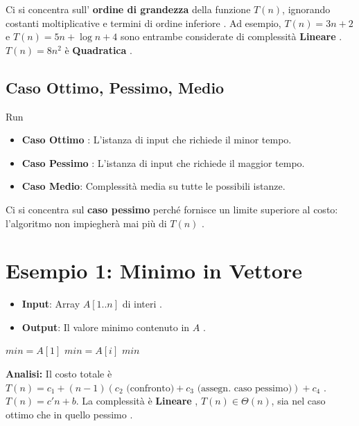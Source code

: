 Ci si concentra sull' \textbf{ordine di grandezza} della funzione $T(n)$, ignorando costanti moltiplicative e termini di ordine inferiore .
Ad esempio, $T(n) = 3n + 2$ e $T(n) = 5n + \log n + 4$ sono entrambe considerate di complessità \textbf{Lineare} . $T(n) = 8n^2$ è \textbf{Quadratica} .

\subsection{Caso Ottimo, Pessimo, Medio}

Run

  
\begin{itemize}
    \item \textbf{Caso Ottimo} : L'istanza di input che richiede il minor tempo.
    \item \textbf{Caso Pessimo} : L'istanza di input che richiede il maggior tempo.
    \item \textbf{Caso Medio}: Complessità media su tutte le possibili istanze.
\end{itemize}
Ci si concentra sul \textbf{caso pessimo} perché fornisce un limite superiore al costo: l'algoritmo non impiegherà mai più di $T(n)$ .

\section{Esempio 1: Minimo in Vettore}
\begin{itemize}
    \item \textbf{Input}: Array $A[1..n]$ di interi .
    \item \textbf{Output}: Il valore minimo contenuto in $A$ .
\end{itemize}

\begin{algorithmic}[1]
    \State $min = A[1]$ 
     
         
            \State $min = A[i]$ 
        \EndIf
    \EndFor
    \State \Return $min$ 
\EndProcedure
\end{algorithmic}

\textbf{Analisi:}
Il costo totale è $T(n) = c_1 + (n-1)(c_2 \text{ (confronto)} + c_3 \text{ (assegn. caso pessimo)}) + c_4$ .
$T(n) = c'n + b$.
La complessità è \textbf{Lineare} , $T(n) \in \Theta(n)$, sia nel caso ottimo che in quello pessimo .

